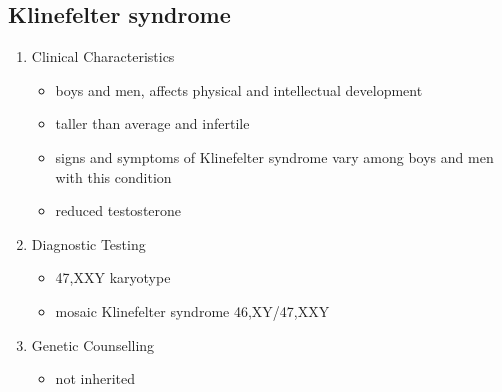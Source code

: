 \documentclass[12pt]{scrartcl}
\begin{document}
\subsection{Klinefelter syndrome}
\label{sec:org8ea4a66}
\begin{enumerate}
\item Clinical Characteristics
\label{sec:org0cba3cf}
\begin{itemize}
\item boys and men, affects physical and intellectual development
\item taller than average and infertile
\item signs and symptoms of Klinefelter syndrome vary among boys and men with this condition
\item reduced testosterone
\end{itemize}
\item Diagnostic Testing
\label{sec:org824349b}
\begin{itemize}
\item 47,XXY karyotype
\item mosaic Klinefelter syndrome 46,XY/47,XXY
\end{itemize}

\item Genetic Counselling
\label{sec:org1eedfcc}
\begin{itemize}
\item not inherited
\end{itemize}
\end{enumerate}
\end{document}
